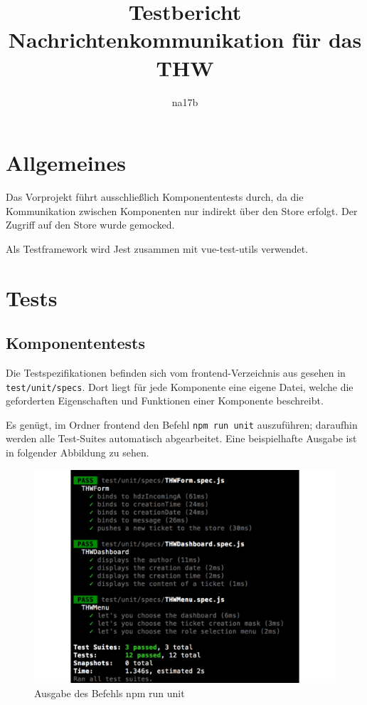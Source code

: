 \documentclass[a4paper,11pt,oneside, titlepage]{article}
\title{Testbericht\\Nachrichtenkommunikation für das THW}
\author{na17b}
\date{}
\begin{document}
  
  \maketitle

  \tableofcontents

  \newpage

  \section{Allgemeines}
  \label{sec:allgemeines}

    Das Vorprojekt führt ausschließlich Komponententests durch, da die Kommunikation
    zwischen Komponenten nur indirekt über den Store erfolgt. Der Zugriff auf den Store wurde
    gemocked.

    Als Testframework wird \gls{Jest} zusammen mit \gls{vue-test-utils} verwendet.
  
  \section{Tests}
  \label{sec:tests}

    \subsection{Komponententests}
    \label{sub:komponententests}

      Die Testspezifikationen befinden sich vom frontend-Verzeichnis aus gesehen in \verb+test/unit/specs+.
      Dort liegt für jede Komponente eine eigene Datei, welche die geforderten Eigenschaften und Funktionen
      einer Komponente beschreibt.

      Es genügt, im Ordner frontend den Befehl \verb+npm run unit+ auszuführen; daraufhin werden alle
      Test-Suites automatisch abgearbeitet. Eine beispielhafte Ausgabe ist in folgender Abbildung zu sehen.

      \begin{figure}[htpb]
        \centering
        \includegraphics[width=0.8\linewidth]{testsscreenshot}
        \caption{Ausgabe des Befehls npm run unit}
        \label{fig:npmtest}
      \end{figure}
\end{document}

